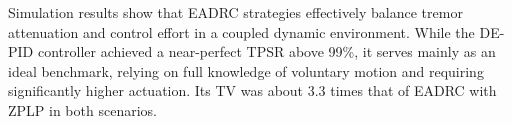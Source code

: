 Simulation results show that EADRC strategies effectively balance tremor attenuation and control effort in a coupled dynamic environment. 
While the DE-PID controller achieved a near-perfect TPSR above 99\%, it serves mainly as an ideal benchmark, relying on full knowledge of voluntary motion and requiring significantly higher actuation. Its TV was about 3.3 times that of EADRC with ZPLP in both scenarios.


